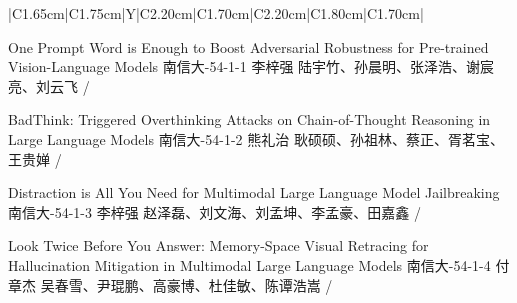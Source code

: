\Needspace{7.5cm}
\begin{tabularx}{\textwidth}{|C{1.65cm}|C{1.75cm}|Y|C{2.20cm}|C{1.70cm}|C{2.20cm}|C{1.80cm}|C{1.70cm}|}
\HeaderRow

{One Prompt Word is Enough to Boost Adversarial Robustness for Pre-trained Vision-Language Models \newline }
{南信大-54-1-1}
{李梓强}
{陆宇竹、孙晨明、张泽浩、谢宸亮、刘云飞}
{}{/}

{BadThink: Triggered Overthinking Attacks on Chain-of-Thought Reasoning in Large Language Models \newline }
{南信大-54-1-2}
{熊礼治}
{耿硕硕、孙祖林、蔡正、胥茗宝、王贵婵}
{}{/}


{Distraction is All You Need for Multimodal Large Language Model Jailbreaking\newline }
{南信大-54-1-3}
{李梓强}
{赵泽磊、刘文海、刘孟坤、李孟豪、田嘉鑫}
{}{/}

{Look Twice Before You Answer: Memory-Space Visual Retracing for Hallucination Mitigation in Multimodal Large Language Models \newline }
{南信大-54-1-4}
{付章杰}
{吴春雪、尹琨鹏、高豪博、杜佳敏、陈谭浩嵩}
{}{/}
\end{tabularx}
\BlockGap







